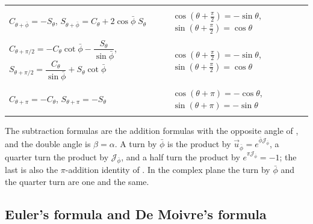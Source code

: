 \documentclass[11pt,a4paper]{amsart}
\makeatletter
\theoremstyle{plain}
\theoremstyle{definition}
\theoremstyle{remark}
\newcommand{\pb}{\bar{\phi}}                     %
\newcommand{\up}{\vec{u}_{\bar{\phi}}}           %
\newcommand{\Jp}{\mathcal{J}_{\bar{\phi}}}       %
\newcommand{\gnlaw}[3]{\multicolumn{2}{@{}l@{}}{\small\itshape #1}\\* #2 & #3 \\ \addlinespace[4pt]}
\newenvironment{gnlaws}{%
  \begin{longtable}{@{}>{\small\raggedright\arraybackslash}p{0.62\textwidth}@{\hspace{0.04\textwidth}}>{\small\raggedright\arraybackslash}p{0.32\textwidth}@{}}
  \toprule
  \multicolumn{1}{@{}l}{\textsc{in a relative plane}} & \multicolumn{1}{l@{}}{\textsc{the complex case}} \\
  \midrule
  \endhead
  \bottomrule
  \endlastfoot}
  {\end{longtable}}
\makeatother
\begin{document}
\begin{gnlaws}
\gnlaw{a turn by $\pb$, the product by $\up$}
  {$C_{\theta + \pb} = -S_\theta$, \quad $S_{\theta + \pb} = C_\theta + 2\cos\pb\;S_\theta$}
  {$\cos(\theta + \tfrac{\pi}{2}) = -\sin\theta$, \newline $\sin(\theta + \tfrac{\pi}{2}) = \cos\theta$}
\gnlaw{a quarter turn, the product by $\Jp$}
  {$C_{\theta + \pi/2} = -C_\theta\cot\pb - \dfrac{S_\theta}{\sin\pb}$, \quad $S_{\theta + \pi/2} = \dfrac{C_\theta}{\sin\pb} + S_\theta\cot\pb$}
  {$\cos(\theta + \tfrac{\pi}{2}) = -\sin\theta$, \newline $\sin(\theta + \tfrac{\pi}{2}) = \cos\theta$}
\gnlaw{a half turn, the product by $-1$}
  {$C_{\theta + \pi} = -C_\theta$, \quad $S_{\theta + \pi} = -S_\theta$}
  {$\cos(\theta + \pi) = -\cos\theta$, \newline $\sin(\theta + \pi) = -\sin\theta$}
\end{gnlaws}
The subtraction formulas are the addition formulas with the opposite angle of , and the double angle is $\beta = \alpha$. A turn by $\pb$ is the product by $\up = e^{\pb\Jp}$, a quarter turn the product by $\Jp$, and a half turn the product by $e^{\pi\Jp} = -1$; the last is also the $\pi$-addition identity of . In the complex plane the turn by $\pb$ and the quarter turn are one and the same.

\subsection{Euler's formula and De Moivre's formula}\label{app:euler}
\end{document}
